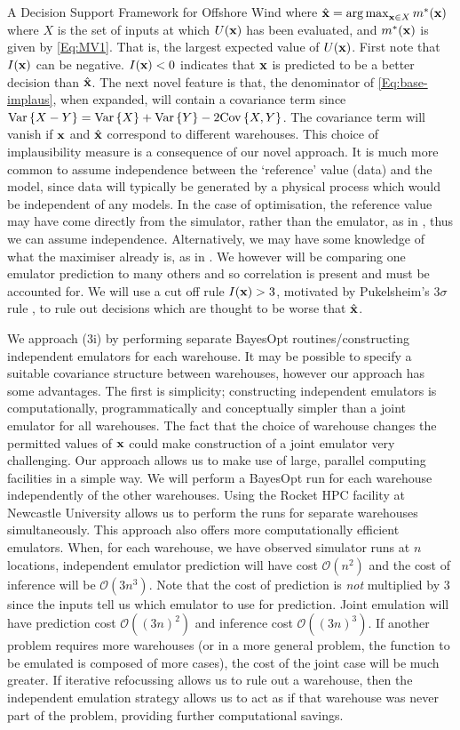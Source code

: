 \begin{chapter}{A Decision Support Framework for Offshore Wind \label{Ch:ds-for-ow}}
where $\hat{\mathbf{x}} = \operatorname*{arg\,max}_{\mathbf{x} \in X} m^{*}(\mathbf{x})$ where $X$ is the set of inputs at which $U(\mathbf{x})$ has been evaluated, and $m^{*}(\mathbf{x})$ is given by \cref{Eq:MV1}. That is, the largest expected value of $U(\mathbf{x})$. First note that $I(\mathbf{x})$ can be negative. $I(\mathbf{x}) < 0$ indicates that $\mathbf{x}$ is predicted to be a better decision than $\hat{\mathbf{x}}$. The next novel feature is that, the denominator of \cref{Eq:base-implaus}, when expanded, will contain a covariance term since $\mathrm{Var}\,\{X - Y\} = \mathrm{Var}\,\{X\} + \mathrm{Var}\,\{Y\} - 2 \mathrm{Cov}\, \{X, Y\}$. The covariance term will vanish if $\mathbf{x}$ and $\hat{\mathbf{x}}$ correspond to different warehouses. This choice of implausibility measure is a consequence of our novel approach. It is much more common to assume independence between the `reference' value (data) and the model, since data will typically be generated by a physical process which would be independent of any models. In the case of optimisation, the reference value may have come directly from the simulator, rather than the emulator, as in \citet{Owen2020}, thus we can assume independence. Alternatively, we may have some knowledge of what the maximiser already is, as in \citet{Nguyen2020}. We however will be comparing one emulator prediction to many others and so correlation is present and must be accounted for. We will use a cut off rule $I(\mathbf{x}) > 3$, motivated by Pukelsheim's $3\sigma$ rule \citep{Pukelsheim1994}, to rule out decisions which are thought to be worse that $\hat{\mathbf{x}}$.

We approach (3i) by performing separate BayesOpt routines/constructing independent emulators for each warehouse. It may be possible to specify a suitable covariance structure between warehouses, however our approach has some advantages. The first is simplicity; constructing independent emulators is computationally, programmatically and conceptually simpler than a joint emulator for all warehouses. The fact that the choice of warehouse changes the permitted values of $\mathbf{x}$ could make construction of a joint emulator very challenging. Our approach allows us to make use of large, parallel computing facilities in a simple way. We will perform a BayesOpt run for each warehouse independently of the other warehouses. Using the Rocket HPC facility at Newcastle University allows us to perform the runs for separate warehouses simultaneously. This approach also offers more computationally efficient emulators. When, for each warehouse, we have observed simulator runs at $n$ locations, independent emulator prediction will have cost $\mathcal{O}(n^2)$ and the cost of inference will be $\mathcal{O}(3n^3)$. Note that the cost of prediction is \textit{not} multiplied by $3$ since the inputs tell us which emulator to use for prediction. Joint emulation will have prediction cost $\mathcal{O}((3n)^2)$ and inference cost $\mathcal{O}((3n)^3)$. If another problem requires more warehouses (or in a more general problem, the function to be emulated is composed of more cases), the cost of the joint case will be much greater. If iterative refocussing allows us to rule out a warehouse, then the independent emulation strategy allows us to act as if that warehouse was never part of the problem, providing further computational savings.


\end{chapter}

